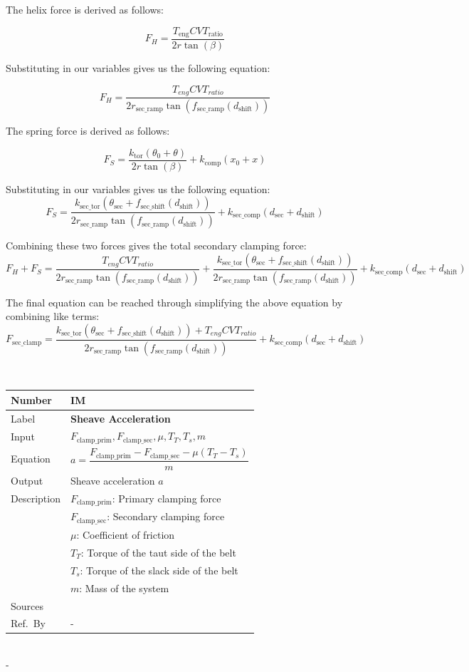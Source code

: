 \documentclass[12pt]{article}
\newcommand{\colAwidth}{0.13\textwidth}
\newcommand{\colBwidth}{0.82\textwidth}
\newcounter{instnum} %
\newcommand{\definstance}[7] {
~\newline
\noindent
\begin{minipage}{\textwidth}
\renewcommand*{\arraystretch}{1.5}
\begin{tabular}{| p{\colAwidth} | p{\colBwidth}|}
  \hline
  \rowcolor[gray]{0.9}
  Number& IM\refstepcounter{instnum}\theinstnum \label{inst:\theinstnum}\\
  \hline
  Label& \bf #1 \\
  \hline
  Input& #2\\
  \hline
  Equation& #3\\
  \hline
  Output& #4\\
  \hline
  Description& #5 \\
  \hline
  Sources& #6 \\
  \hline
  Ref.\ By & #7\\
  \hline
\end{tabular}
\end{minipage}\\
}
\begin{document}
The helix force is derived as follows:

\[
F_H = \frac{T_{\text{eng}}CVT_{\text{ratio}}}{2r\tan(\beta)}
\]

Substituting in our variables gives us the following equation:

\[
F_H = \frac{T_{eng} CVT_{ratio}}{2 r_{\text{sec\_ramp}} \tan(f_{\text{sec\_ramp}}(d_{\text{shift}}))}
\]

The spring force is derived as follows:

\[
F_S = \frac{k_{\text{tor}}(\theta_0 + \theta)}{2r\tan(\beta)} + k_\text{comp}(x_0 + x)
\]

Substituting in our variables gives us the following equation:
\[
F_S = \frac{k_{\text{sec\_tor}} (\theta_{\text{sec}} + f_{\text{sec\_shift}}(d_{\text{shift}}))}{2 r_{\text{sec\_ramp}} \tan(f_{\text{sec\_ramp}}(d_{\text{shift}}))} + k_{\text{sec\_comp}} (d_{\text{sec}} + d_{\text{shift}})
\]

Combining these two forces gives the total secondary clamping force:
\[
F_H + F_S = \frac{T_{eng} CVT_{ratio}}{2 r_{\text{sec\_ramp}} \tan(f_{\text{sec\_ramp}}(d_{\text{shift}}))} + \frac{k_{\text{sec\_tor}} (\theta_{\text{sec}} + f_{\text{sec\_shift}}(d_{\text{shift}}))}{2 r_{\text{sec\_ramp}} \tan(f_{\text{sec\_ramp}}(d_{\text{shift}}))} + k_{\text{sec\_comp}} (d_{\text{sec}} + d_{\text{shift}})
\]

The final equation can be reached through simplifying the above equation by combining like terms:
\[
F_{\text{sec\_clamp}} = \frac{k_{\text{sec\_tor}} (\theta_{\text{sec}} + f_{\text{sec\_shift}}(d_{\text{shift}})) + T_{eng} CVT_{ratio}}{2 r_{\text{sec\_ramp}} \tan(f_{\text{sec\_ramp}}(d_{\text{shift}}))} + k_{\text{sec\_comp}} (d_{\text{sec}} + d_{\text{shift}})
\]

\definstance
{Sheave Acceleration}
{$F_{\text{clamp\_prim}}, F_{\text{clamp\_sec}}, \mu, T_T, T_s, m$} %
{\[a = \frac{F_{\text{clamp\_prim}} - F_{\text{clamp\_sec}} - \mu (T_T - T_s)}{m}\]} %
{Sheave acceleration $a$} %
{$F_{\text{clamp\_prim}}$: Primary clamping force\\
  &$F_{\text{clamp\_sec}}$: Secondary clamping force\\
  &$\mu$: Coefficient of friction\\
  &$T_T$: Torque of the taut side of the belt\\
  &$T_s$: Torque of the slack side of the belt\\
  &$m$: Mass of the system} %
{} %
{-}
{} %
{} %
{-}
\end{document}
